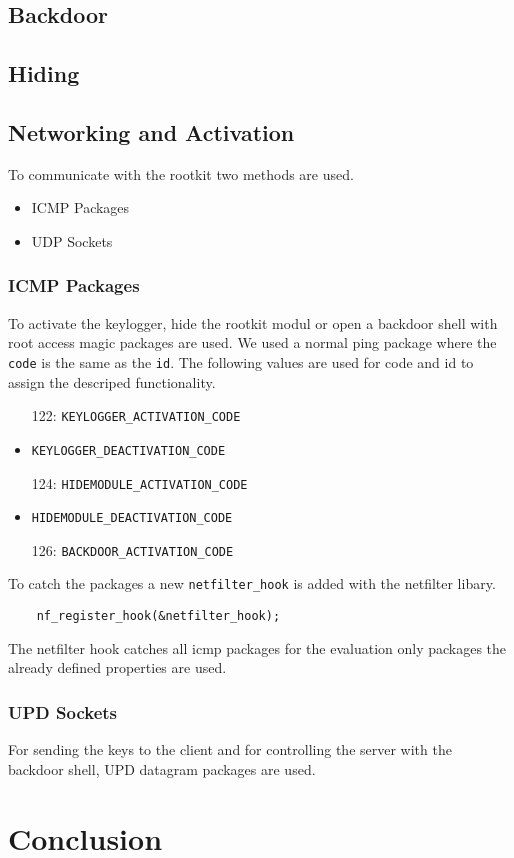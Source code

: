 \documentclass[12pt]{article}
\begin{document}
\subsection{Backdoor}
\subsection{Hiding}

\subsection{Networking and Activation}
\label{sec:magicpackage}
To communicate with the rootkit two methods are used.
\begin{itemize}
	\item ICMP Packages
	\item UDP Sockets
\end{itemize}
\subsubsection{ICMP Packages}
To activate the keylogger, hide the rootkit modul or open a backdoor shell with root access magic packages are used. We used a normal ping package where the \lstinline{code} is the same as the \lstinline{id}. The following values are used for code and id to assign the descriped functionality.
\begin{itemize}
	\item[122:] \lstinline{KEYLOGGER_ACTIVATION_CODE}
	\item[123:] \lstinline{KEYLOGGER_DEACTIVATION_CODE}
	\item[124:] \lstinline{HIDEMODULE_ACTIVATION_CODE}
	\item[125:] \lstinline{HIDEMODULE_DEACTIVATION_CODE}
	\item[126:] \lstinline{BACKDOOR_ACTIVATION_CODE}
\end{itemize}

To catch the packages a new \lstinline{netfilter_hook} is added with the netfilter libary. 
\begin{lstlisting}
	nf_register_hook(&netfilter_hook);
\end{lstlisting}

The netfilter hook catches all icmp packages for the evaluation only packages the already defined properties are used. 

\subsubsection{UPD Sockets}
For sending the keys to the client and for controlling the server with the backdoor shell, UPD datagram packages are used.

\section{Conclusion}
\end{document}
